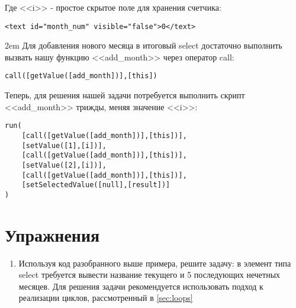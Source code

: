 \documentclass[../index.tex]{subfiles}
\begin{document}
Где <<i>> - простое скрытое поле для хранения счетчика:
\begin{verbatim}
<text id="month_num" visible="false">0</text>
\end{verbatim}
\emergencystretch 2em
Для добавления нового месяца в итоговый select достаточно выполнить вызвать нашу функцию <<add\_month>> через оператор call: 

\begin{verbatim}
call([getValue([add_month])],[this])
\end{verbatim}

Теперь, для решения нашей задачи потребуется выполнить скрипт <<add\_month>> трижды, меняя значение <<i>>:

\begin{verbatim}
run(
    [call([getValue([add_month])],[this])],
    [setValue([1],[i])],
    [call([getValue([add_month])],[this])],
    [setValue([2],[i])],
    [call([getValue([add_month])],[this])],
    [setSelectedValue([null],[result])]
)
\end{verbatim}
\section{Упражнения}
    \begin{enumerate}
        \item Используя код разобранного выше примера, решите задачу: в элемент типа select требуется вывести название текущего и 5 последующих нечетных месяцев. Для решения задачи рекомендуется использовать подход к реализации циклов, рассмотренный в  \autoref{sec:loops}            
    \end{enumerate}
\end{document}
